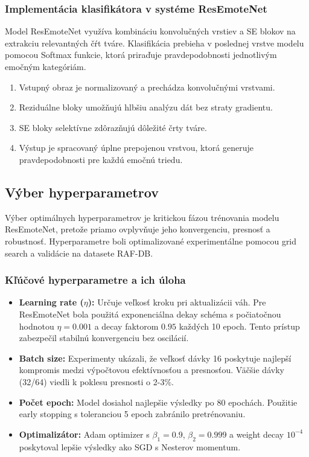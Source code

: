 \subsubsection{Implementácia klasifikátora v systéme ResEmoteNet}
Model ResEmoteNet využíva kombináciu konvolučných vrstiev a SE blokov na extrakciu relevantných čŕt tváre. Klasifikácia prebieha v poslednej vrstve modelu pomocou Softmax funkcie, ktorá priraďuje pravdepodobnosti jednotlivým emočným kategóriám.

\begin{enumerate}
    \item Vstupný obraz je normalizovaný a prechádza konvolučnými vrstvami.
    \item Reziduálne bloky umožňujú hlbšiu analýzu dát bez straty gradientu.
    \item SE bloky selektívne zdôrazňujú dôležité črty tváre.
    \item Výstup je spracovaný úplne prepojenou vrstvou, ktorá generuje pravdepodobnosti pre každú emočnú triedu.
\end{enumerate}

\subsection{Výber hyperparametrov}

Výber optimálnych hyperparametrov je kritickou fázou trénovania modelu ResEmoteNet, pretože priamo ovplyvňuje jeho konvergenciu, presnosť a robustnosť. Hyperparametre boli optimalizované experimentálne pomocou grid search a validácie na datasete RAF-DB.

\subsubsection{Kľúčové hyperparametre a ich úloha}

\begin{itemize}
    \item \textbf{Learning rate ($\eta$):} 
    Určuje veľkosť kroku pri aktualizácii váh. Pre ResEmoteNet bola použitá exponenciálna dekay schéma s počiatočnou hodnotou $\eta = 0.001$ a decay faktorom $0.95$ každých 10 epoch. Tento prístup zabezpečil stabilnú konvergenciu bez oscilácií.

    \item \textbf{Batch size:} 
    Experimenty ukázali, že veľkosť dávky 16 poskytuje najlepší kompromis medzi výpočtovou efektívnosťou a presnosťou. Väčšie dávky (32/64) viedli k poklesu presnosti o 2-3\%.

    \item \textbf{Počet epoch:} 
    Model dosiahol najlepšie výsledky po 80 epochách. Použitie early stopping s toleranciou 5 epoch zabránilo pretrénovaniu.

    \item \textbf{Optimalizátor:} 
    Adam optimizer s $\beta_1=0.9$, $\beta_2=0.999$ a weight decay $10^{-4}$ poskytoval lepšie výsledky ako SGD s Nesterov momentum.
\end{itemize}

